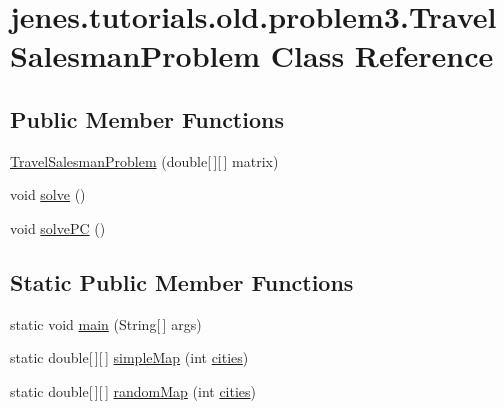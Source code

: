 \hypertarget{classjenes_1_1tutorials_1_1old_1_1problem3_1_1_travel_salesman_problem}{\section{jenes.\-tutorials.\-old.\-problem3.\-Travel\-Salesman\-Problem Class Reference}
\label{classjenes_1_1tutorials_1_1old_1_1problem3_1_1_travel_salesman_problem}
}
\subsection*{Public Member Functions}
\begin{DoxyCompactItemize}
\item 
\hyperlink{classjenes_1_1tutorials_1_1old_1_1problem3_1_1_travel_salesman_problem_ae81620be1ad206e8226f0c0dc913ab44}{Travel\-Salesman\-Problem} (double\mbox{[}$\,$\mbox{]}\mbox{[}$\,$\mbox{]} matrix)
\item 
void \hyperlink{classjenes_1_1tutorials_1_1old_1_1problem3_1_1_travel_salesman_problem_ac5e087aada09768a49ab10f7178e938f}{solve} ()
\item 
void \hyperlink{classjenes_1_1tutorials_1_1old_1_1problem3_1_1_travel_salesman_problem_a94afc262b0ac0e840be70087dd6e11f3}{solve\-P\-C} ()
\end{DoxyCompactItemize}
\subsection*{Static Public Member Functions}
\begin{DoxyCompactItemize}
\item 
static void \hyperlink{classjenes_1_1tutorials_1_1old_1_1problem3_1_1_travel_salesman_problem_a4688916bf8ef318b6fae58a75c0e3184}{main} (String\mbox{[}$\,$\mbox{]} args)
\item 
static double\mbox{[}$\,$\mbox{]}\mbox{[}$\,$\mbox{]} \hyperlink{classjenes_1_1tutorials_1_1old_1_1problem3_1_1_travel_salesman_problem_a7fbfddf2063f030d8b44585843eab8c6}{simple\-Map} (int \hyperlink{classjenes_1_1tutorials_1_1old_1_1problem3_1_1_travel_salesman_problem_a244d5923b96b3392663fc531fd792348}{cities})
\item 
static double\mbox{[}$\,$\mbox{]}\mbox{[}$\,$\mbox{]} \hyperlink{classjenes_1_1tutorials_1_1old_1_1problem3_1_1_travel_salesman_problem_a19e333c608bc56c65b32c5fc98dc760a}{random\-Map} (int \hyperlink{classjenes_1_1tutorials_1_1old_1_1problem3_1_1_travel_salesman_problem_a244d5923b96b3392663fc531fd792348}{cities})
\end{DoxyCompactItemize}
